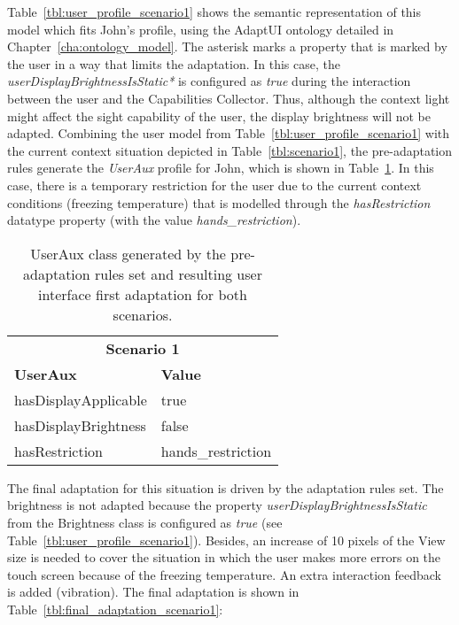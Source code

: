 Table~\ref{tbl:user_profile_scenario1} shows the semantic representation of 
this model which fits John’s profile, using the AdaptUI ontology detailed in 
Chapter~\ref{cha:ontology_model}. The asterisk marks a property that is marked by the 
user in a way that limits the adaptation. In this case, the 
\textit{userDisplayBrightnessIsStatic*} is configured as \textit{true} during 
the interaction between the user and the Capabilities Collector. Thus, although 
the context light might affect the sight capability of the user, the display 
brightness will not be adapted. Combining the user model from 
Table~\ref{tbl:user_profile_scenario1} with the current context situation
depicted in Table~\ref{tbl:scenario1}, the pre-adaptation rules generate the
\textit{UserAux} profile for John, which is shown in 
Table~\ref{tbl:userAux_scenario1}. In this case, there is a temporary 
restriction for the user due to the current context conditions (freezing 
temperature) that is modelled through the \textit{hasRestriction} datatype 
property (with the value \textit{hands\_restriction}). 

\begin{table}
 \caption{UserAux class generated by the pre-adaptation rules set and resulting
 user interface first adaptation for both scenarios.}
 \label{tbl:userAux_scenario1}
 \footnotesize
 \centering
\begin{tabular}{l l}
  \hline 
  \multicolumn{2}{c}{\textbf{Scenario 1}}	\\
  \textbf{UserAux} 	& \textbf{Value}	\\
  \hline
  hasDisplayApplicable 	& true			\\
  hasDisplayBrightness	& false			\\
  hasRestriction	& hands\_restriction	\\
  \hline
\end{tabular}
\end{table}

The final adaptation for this situation is driven by the adaptation rules set.
The brightness is not adapted because the property 
\textit{userDisplayBrightnessIsStatic} from the Brightness class is configured 
as \textit{true} (see Table~\ref{tbl:user_profile_scenario1}). Besides, an 
increase of 10 pixels of the View size is needed to cover the situation in 
which the user makes more errors on the touch screen because of the freezing
temperature. An extra interaction feedback is added (vibration). The final 
adaptation is shown in Table~\ref{tbl:final_adaptation_scenario1}:

